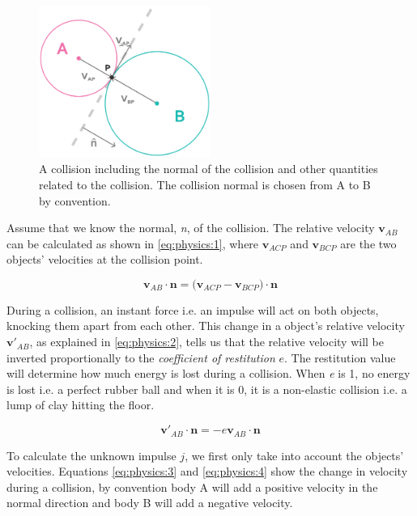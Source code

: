 \documentclass[a4paper,12pt]{report}
\begin{document}
\begin{figure}[!ht]
    \centering
    \includegraphics[width=0.5\textwidth]{figures/collision.png}
    \caption{A collision including the normal of the collision and other quantities related to the collision. The collision normal is chosen from A to B by convention.}
    \label{fig:collision}
\end{figure}

Assume that we know the normal, \emph{n}, of the collision. The relative velocity $\mathbf v_{AB}$ can be calculated as shown in \eqref{eq:physics:1}, where $\mathbf v_{ACP}$ and $\mathbf v_{BCP}$ are the two objects' velocities at the collision point.

\begin{equation}
\mathbf v_{AB}\cdot \mathbf n=\mathbf (\mathbf v_{ACP} - \mathbf v_{BCP})\cdot \mathbf n
\label{eq:physics:1}
\end{equation}

During a collision, an instant force i.e. an impulse will act on both objects, knocking them apart from each other. This change in a object’s relative velocity $\mathbf v'_{AB}$, as explained in \eqref{eq:physics:2}, tells us that the relative velocity will be inverted proportionally to the \emph{coefficient of restitution} $e$. The restitution value will determine how much energy is lost during a collision. When \emph{e} is 1, no energy is lost i.e. a perfect rubber ball and when it is 0, it is a non-elastic collision i.e. a lump of clay hitting the floor.

\begin{equation}
\mathbf v'_{AB}\cdot \mathbf n=-e\mathbf v_{AB}\cdot \mathbf n
\label{eq:physics:2}
\end{equation}

To calculate the unknown impulse $j$, we first only take into account the objects' velocities. Equations \eqref{eq:physics:3} and \eqref{eq:physics:4} show the change in velocity during a collision, by convention body A will add a positive velocity in the normal direction and body B will add a negative velocity.
\end{document}
